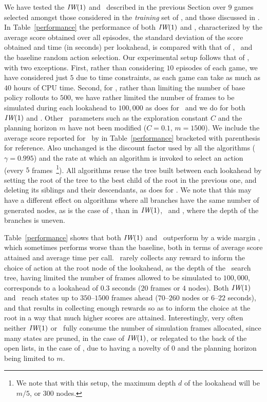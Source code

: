 We have tested the ${\textit{IW}}(1)$ and \BFS~described in the previous Section
over $9$ games selected amongst those considered in the \emph{training} set
of \cite{bellemare:jair2013}, and those discussed in \cite{deep-mind-atari}. 
In Table~\ref{performance} the performance of both ${\textit{IW}}(1)$ 
and \BFS, characterized by the average score obtained over all episodes, the standard deviation
of the score obtained and time (in seconds) per lookahead, is compared with that of \UCT, 
\BRFS~and the baseline random action selection. Our experimental 
setup  follows that of \cite{bellemare:jair2013}, with two exceptions. First, rather than
considering $10$ episodes of each game, we have considered just $5$
due to time constraints, as each game can take as much as $40$ hours of 
CPU time. Second, for \UCT, rather than limiting the number of
base policy rollouts to $500$, we have rather limited the number of frames
to be simulated during each lookahead to $100,000$ as \cite{bellemare:jair2013} 
does for \BRFS~and we do for both ${\textit{IW}}(1)$ and \BFS. Other \UCT~parameters such as the exploration constant $C$ and
the planning horizon $m$ have not been modified ($C=0.1$, $m=1500$). We include
the average score reported for \UCT~by \cite{bellemare:jair2013} in Table~\ref{performance}
bracketed with parenthesis for reference. Also unchanged is the discount factor
used by all the algorithms ($\gamma=0.995$) and the rate at which an algorithm is
invoked to select an action (every $5$ frames~\footnote{We note that with this setup, the maximum depth $d$
of the lookahead will be $m/5$, or $300$ nodes.}). All algorithms reuse the tree built between each 
lookahead by setting the root of the tree to the best child of the root in the previous one,
and deleting its siblings and their descendants, as \cite{bellemare:jair2013} does for \UCT. We note that 
this may have a different effect on algorithms where all branches have the same number of
generated nodes, as is the case of \BRFS, than in ${\textit{IW}}(1)$, \BFS~and \UCT, where the depth of
the branches is uneven.

Table~\ref{performance} shows that both ${\textit{IW}}(1)$ and \BFS~outperform by a wide margin 
\BRFS, which sometimes performs worse than the baseline, both in terms of average score attained and 
average time per call. \BRFS~rarely collects any reward to inform the choice of action at
the root node of the lookahead, as the depth of the \BRFS~search tree, having limited the number of
frames allowed to be simulated to $100,000$, corresponds to a lookahead of $0.3$ seconds ($20$ 
frames or $4$ nodes). Both ${\textit{IW}}(1)$ and \BFS~reach states up to $350$--$1500$ frames ahead 
($70$--$260$ nodes or $6$--$22$ seconds), and that results in collecting enough rewards so as to
inform the choice at the root in a way that much higher scores are attained. Interestingly, very often
neither ${\textit{IW}}(1)$ or \BFS~fully consume the number of simulation frames allocated, since many
states are pruned, in the case of ${\textit{IW}}(1)$, or relegated to the back of the open lists, in the 
case of \BFS, due to having a novelty of $0$ and the planning horizon being limited to $m$. 

